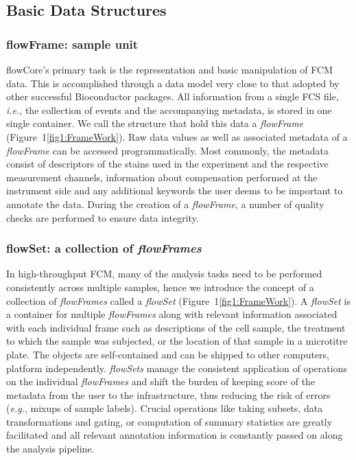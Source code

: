 \documentclass[10pt]{bmc_article}
\newcommand{\Rpackage}[1]{{\textsf{#1}}}
\newcommand{\Rclass}[1]{{\textit{#1}}}
\newenvironment{bmcformat}{\begin{raggedright}\baselineskip20pt\sloppy\setboolean{publ}{false}}{\end{raggedright}\baselineskip20pt\sloppy}
\begin{document}
\begin{bmcformat}
\subsection*{Basic Data Structures}
\subsubsection*{flowFrame: sample unit}
\Rpackage{flowCore}'s primary task is the representation and basic
manipulation of FCM data. This is accomplished through a data model
very close to that adopted by other successful Bioconductor
packages. All information from a single FCS file, \textit{i.e.}, the
collection of events and the accompanying metadata, is stored in one
single container. We call the structure that hold this data a
\Rclass{flowFrame} (Figure~1\ref{fig1:FrameWork}). Raw data values as
well as associated metadata of a \Rclass{flowFrame} can be accessed
programmatically. Most commonly, the metadata consist of descriptors
of the stains used in the experiment and the respective measurement
channels, information about compensation performed at the instrument
side and any additional keywords the user deems to be important to
annotate the data. During the creation of a \Rclass{flowFrame}, a
number of quality checks are performed to ensure data integrity.

\subsubsection*{flowSet: a collection of  \Rclass{flowFrames}}
In high-throughput FCM, many of the analysis tasks need to be
performed consistently across multiple samples, hence we introduce the
concept of a collection of \Rclass{flowFrames} called a
\Rclass{flowSet} (Figure~1\ref{fig1:FrameWork}). A \Rclass{flowSet} is
a container for multiple \Rclass{flowFrames} along with relevant
information associated with each individual frame such as descriptions
of the cell sample, the treatment to which the sample was subjected,
or the location of that sample in a microtitre plate.  The objects are
self-contained and can be shipped to other computers, platform
independently. \Rclass{flowSets} manage the consistent application of
operations on the individual \Rclass{flowFrames} and shift the burden
of keeping score of the metadata from the user to the infrastructure,
thus reducing the risk of errors (\textit{e.g.}, mixups of sample
labels). Crucial operations like taking subsets, data transformations
and gating, or computation of summary statistics are greatly
facilitated and all relevant annotation information is constantly
passed on along the analysis pipeline.


\end{bmcformat}
\end{document}
